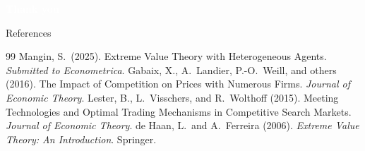 \documentclass[aspectratio=169,xcolor=dvipsnames]{beamer}
\begin{document}
{
\begin{frame}
    \centering
    \vspace{2mm}
    \Huge \textcolor{white}{\textbf{Thank you}}
\end{frame}
}

\begin{frame}[allowframebreaks]{References}
    \small
    \begin{thebibliography}{99}
            Mangin, S.\ (2025). Extreme Value Theory with Heterogeneous Agents. \textit{Submitted to Econometrica}.
            Gabaix, X., A.\ Landier, P.-O.\ Weill, and others (2016). The Impact of Competition on Prices with Numerous Firms. \textit{Journal of Economic Theory}.
            Lester, B., L.\ Visschers, and R.\ Wolthoff (2015). Meeting Technologies and Optimal Trading Mechanisms in Competitive Search Markets. \textit{Journal of Economic Theory}.
            de Haan, L.\ and A.\ Ferreira (2006). \textit{Extreme Value Theory: An Introduction}. Springer.
    \end{thebibliography}
\end{frame}
\end{document}
